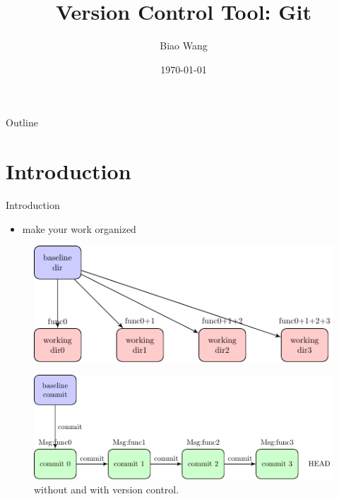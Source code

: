 \documentclass{beamer}
\title[]{Version Control Tool: Git}
\author{Biao Wang}
\institute{Anacode}
\date{\today}
\begin{document}

\begin{frame}{Outline}
 \tableofcontents
\end{frame}

\section{Introduction}
\begin{frame}{Introduction}
    \begin{itemize}
      \item make your work organized      
    \end{itemize}  
    \begin{figure}
      \includegraphics[width=.7\textwidth]{figures/withoutversioncontrol.pdf}      
    \end{figure}
    \begin{figure}
      \includegraphics[width=.7\textwidth]{figures/withversioncontrol.pdf}
      \caption{\label{git life cycle} without and with version control.}
    \end{figure}         
\end{frame}
\end{document}
